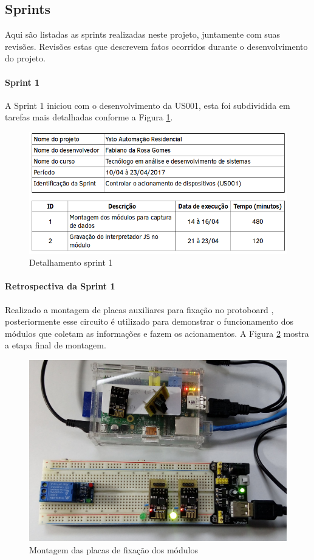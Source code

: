 \subsection{Sprints}
Aqui são listadas as sprints realizadas neste projeto, juntamente com suas revisões. Revisões estas que descrevem fatos ocorridos durante o desenvolvimento do projeto.

\paragraph{Sprint 1} A Sprint 1 iniciou com o desenvolvimento da US001, esta foi subdividida em tarefas mais detalhadas conforme a Figura \ref{sprint-1}.

\begin{figure}[H]
\caption{\label{sprint-1} Detalhamento sprint 1}
\includegraphics[scale=0.5]{img/sprint-1.png}
\end{figure}

\paragraph{Retrospectiva da Sprint 1} Realizado a montagem de placas auxiliares para fixação no protoboard , posteriormente esse circuito é utilizado para demonstrar o funcionamento dos módulos que coletam as informações e fazem os acionamentos. A Figura \ref{ysto-preeview} mostra a etapa final de montagem.

\begin{figure}[H]
\caption{\label{ysto-preeview} Montagem das placas de fixação dos módulos}
\includegraphics[scale=0.15]{img/ysto-preview.jpg}
\end{figure}


